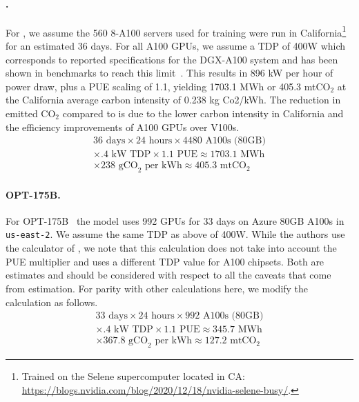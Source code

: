 \paragraph{\mtnlgfivethreezero.} For \mtnlgfivethreezero, we assume the 560 8-A100 servers used for training were run in California\footnote{Trained on the Selene supercomputer located in CA: \url{https://blogs.nvidia.com/blog/2020/12/18/nvidia-selene-busy/}.} for an estimated 36 days.
For all A100 GPUs, we assume a TDP of 400W which corresponds to reported specifications for the DGX-A100 system and has been shown in benchmarks to reach this limit~\citep{vspetko2021dgx}. This results in 896 kW per hour of power draw, plus a PUE scaling of 1.1, yielding 1703.1 MWh or 405.3 mtCO$_\text{2}$ at the California average carbon intensity of 0.238 kg Co2/kWh. The reduction in emitted CO$_\text{2}$ compared to \gptdavinci is due to the lower carbon intensity in California and the efficiency improvements of A100 GPUs over V100s.
\begin{align*}
    36 \text{ days} \times 24 \text{ hours} \times \text{$4480$ A100s (80GB)}\\
    \times .4 \text{ kW TDP} \times 1.1 \text{ PUE}  \approx 1703.1\text{ MWh}\\
    \times 238 \text{ gCO}_\text{2} \text{ per kWh} \approx 405.3 \text{ mtCO}_\text{2}
\end{align*}

\paragraph{OPT-175B.} For OPT-175B~\citep{zhang2022opt} the model uses 992 GPUs for 33 days on Azure 80GB A100s in \texttt{us-east-2}. We assume the same TDP as above of 400W.
While the authors use the calculator of \citet{lacoste2019quantifying}, we note that this calculation does not take into account the PUE multiplier and uses a different TDP value for A100 chipsets. Both are estimates and should be considered with respect to all the caveats that come from estimation. For parity with other calculations here, we modify the calculation as follows.
\begin{align*}
    33 \text{ days} \times 24 \text{ hours} \times \text{$992$ A100s (80GB)} \\ 
    \times .4 \text{ kW TDP}\times 1.1 \text{ PUE} \approx 345.7 \text{ MWh}\\
    \times 367.8 \text{ gCO}_\text{2} \text{ per kWh}  \approx 127.2 \text{ mtCO}_\text{2}
\end{align*}

